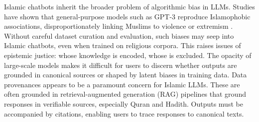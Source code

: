 \documentclass{article}
\begin{document}
Islamic chatbots inherit the broader problem of algorithmic bias in LLMs. Studies have shown that general-purpose models such as GPT-3 reproduce Islamophobic associations, disproportionately linking Muslims to violence or extremism \citep{abid2021}. Without careful dataset curation and evaluation, such biases may seep into Islamic chatbots, even when trained on religious corpora. This raises issues of epistemic justice: whose knowledge is encoded, whose is excluded. The opacity of large-scale models makes it difficult for users to discern whether outputs are grounded in canonical sources or shaped by latent biases in training data. Data provenances appears to be a paramount concern for Islamic LLMs. These are often grounded in retrieval-augmented generation (RAG) pipelines that ground responses in verifiable sources, especially Quran and Hadith. Outputs must be accompanied by citations, enabling users to trace responses to canonical texts.
\end{document}
